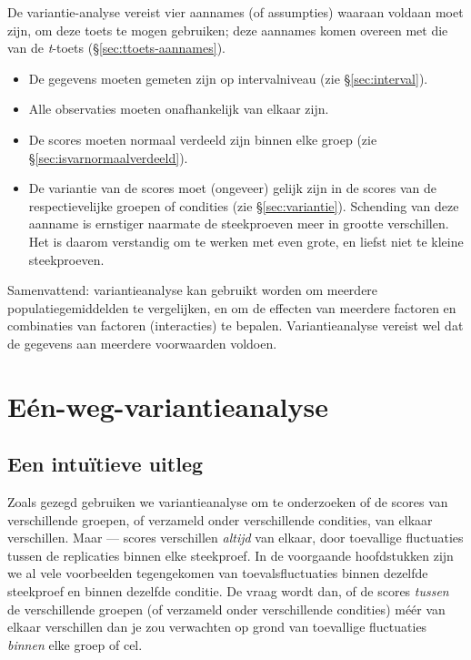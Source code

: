 \documentclass[
]{book}
\begin{document}
De variantie-analyse vereist vier aannames (of assumpties) waaraan
voldaan moet zijn, om deze toets te mogen gebruiken; deze aannames komen
overeen met die van de \emph{t}-toets
(§\ref{sec:ttoets-aannames}).

\begin{itemize}
\item
  De gegevens moeten gemeten zijn op intervalniveau (zie
  §\ref{sec:interval}).
\item
  Alle observaties moeten onafhankelijk van elkaar zijn.
\item
  De scores moeten normaal verdeeld zijn
  binnen elke groep (zie §\ref{sec:isvarnormaalverdeeld}).
\item
  De variantie van de scores moet (ongeveer) gelijk zijn in de
  scores van de respectievelijke groepen of condities (zie
  §\ref{sec:variantie}).
  Schending van deze aanname is ernstiger
  naarmate de steekproeven meer in grootte verschillen. Het is daarom
  verstandig om te werken met even grote, en liefst niet te kleine
  steekproeven.
\end{itemize}

Samenvattend: variantieanalyse kan gebruikt worden om meerdere
populatiegemiddelden te vergelijken, en om de effecten van meerdere
factoren en combinaties van factoren (interacties) te bepalen.
Variantieanalyse vereist wel dat de gegevens aan meerdere voorwaarden
voldoen.

\section{Eén-weg-variantieanalyse}\label{euxe9n-weg-variantieanalyse}

\subsection{Een intuïtieve uitleg}\label{sec:anova-oneway-uitleg}

Zoals gezegd gebruiken we variantieanalyse om te onderzoeken of de
scores van verschillende groepen, of verzameld onder verschillende
condities, van elkaar verschillen. Maar --- scores verschillen \emph{altijd}
van elkaar, door toevallige fluctuaties tussen de replicaties binnen
elke steekproef. In de voorgaande hoofdstukken zijn we al vele
voorbeelden tegengekomen van toevalsfluctuaties binnen dezelfde
steekproef en binnen dezelfde conditie. De vraag wordt dan, of de scores
\emph{tussen} de verschillende groepen (of verzameld onder verschillende
condities) méér van elkaar verschillen dan je zou verwachten op grond
van toevallige fluctuaties \emph{binnen} elke groep of cel.
\end{document}
